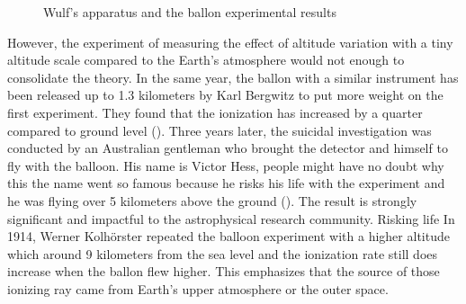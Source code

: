 \begin{figure}[h!]
    \centering
        \hfill
        \caption{Wulf's apparatus and the ballon experimental results}
       \label{fig:xxx}
\end{figure}


However, the experiment of measuring the effect of altitude
variation with a tiny altitude scale compared to the Earth's
atmosphere would not enough to consolidate the theory.
In the same year, the ballon with a similar instrument has
been released up to 1.3 kilometers by Karl Bergwitz to put more weight on the first experiment. They found that the 
ionization has increased by a quarter compared to ground level 
(\cite{de2014atmospheric}).
Three years later, the suicidal investigation was conducted by 
an Australian gentleman who brought the detector and himself
to fly with the balloon.
His name is Victor Hess, people might have no doubt why this
the name went so famous because he risks his life with the experiment 
and he was flying over 5 kilometers above the ground (\cite{hess1912beobachtungen}).
The result is strongly significant and impactful
to the astrophysical research community. Risking life  
In 1914, Werner Kolhörster repeated the balloon experiment 
with a higher altitude which around 9 kilometers from the 
sea level and the ionization rate still does increase when 
the ballon flew higher. This emphasizes that the source of 
those ionizing ray came from Earth's upper atmosphere
or the outer space.

